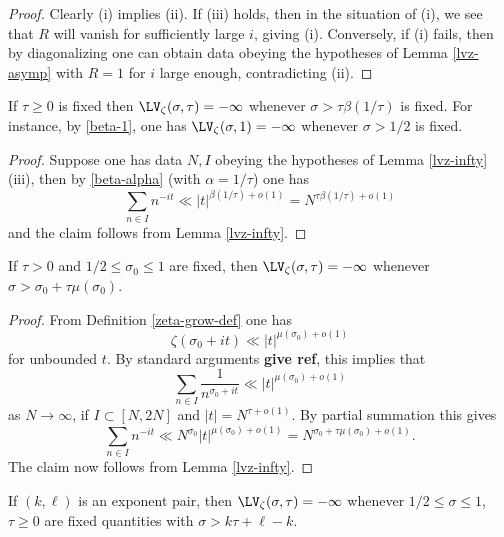 \begin{proof} Clearly (i) implies (ii).  
If (iii) holds, then in the situation of (i), we see that $R$ will vanish for sufficiently large $i$, giving (i). Conversely, if (i) fails, then by diagonalizing one can obtain data obeying the hypotheses of Lemma \ref{lvz-asymp} with $R=1$ for $i$ large enough, contradicting (ii).
\end{proof}

\begin{corollary}\label{beta-zeta-vanish}  If $\tau \geq 0$ is fixed then $\LV_\zeta(\sigma,\tau) = -\infty$ whenever $\sigma > \tau \beta(1/\tau)$ is fixed. For instance, by \eqref{beta-1}, one has $\LV_\zeta(\sigma,1)=-\infty$ whenever $\sigma > 1/2$ is fixed.
\end{corollary}

\begin{proof} Suppose one has data $N, I$  obeying the hypotheses of Lemma \ref{lvz-infty}(iii), then by \eqref{beta-alpha} (with $\alpha = 1/\tau$) one has
$$ \sum_{n \in I} n^{-it} \ll |t|^{\beta(1/\tau)+o(1)} = N^{\tau \beta(1/\tau)+o(1)}$$
and the claim follows from Lemma \ref{lvz-infty}.
\end{proof}
    
\begin{corollary}\label{lvz-mu}  If $\tau > 0$ and $1/2 \leq \sigma_0 \leq 1$ are fixed, then $\LV_\zeta(\sigma,\tau) = -\infty$ whenever $\sigma > \sigma_0 + \tau \mu(\sigma_0)$.  
\end{corollary}

\begin{proof} From Definition \ref{zeta-grow-def} one has
    $$ \zeta(\sigma_0 + it) \ll |t|^{\mu(\sigma_0) + o(1)}$$
    for unbounded $t$.  By standard arguments {\bf give ref}, this implies that
    $$ \sum_{n \in I} \frac{1}{n^{\sigma_0+it}} \ll |t|^{\mu(\sigma_0) + o(1)}$$
as $N \to \infty$, if $I \subset [N,2N]$ and $|t| = N^{\tau+o(1)}$.  By partial summation this gives
$$ \sum_{n \in I} n^{-it} \ll N^{\sigma_0} |t|^{\mu(\sigma_0) + o(1)} = N^{\sigma_0 + \tau \mu(\sigma_0) + o(1)}.$$
The claim now follows from Lemma \ref{lvz-infty}.
\end{proof}

\begin{corollary}\label{lvz-exp} If $(k,\ell)$ is an exponent pair, then $\LV_\zeta(\sigma,\tau) = -\infty$ whenever $1/2 \leq \sigma \leq 1$, $\tau \geq 0$ are fixed quantities with $\sigma > k \tau + \ell - k$.
\end{corollary}

